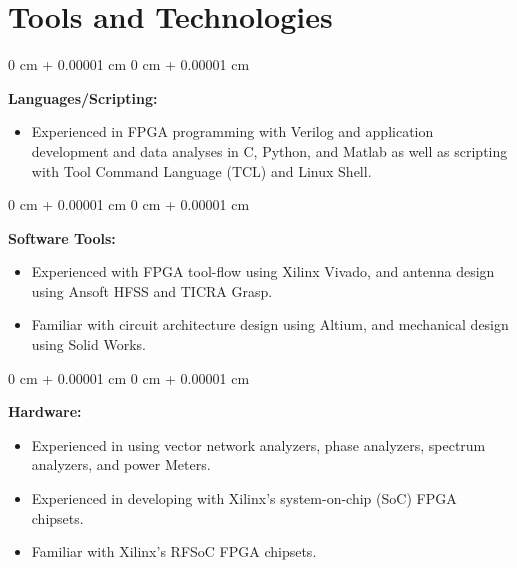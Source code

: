 \documentclass[10pt, letterpaper]{article}
\newenvironment{highlights}{
    \begin{itemize}[
        topsep=0.10 cm,
        parsep=0.10 cm,
        partopsep=0pt,
        itemsep=0pt,
        leftmargin=0 cm + 10pt     
    ]
}{
    \end{itemize}
} %
\newenvironment{onecolentry}{
    \begin{adjustwidth}{
        0 cm + 0.00001 cm
    }{
        0 cm + 0.00001 cm
    }
}{
    \end{adjustwidth}
} %
\begin{document}
    \section{Tools and Technologies}        
        \begin{onecolentry}
            \textbf{Languages/Scripting:} 
            \begin{highlights}
            \item Experienced in FPGA programming with Verilog and application development and data analyses in C, Python, and Matlab as well as scripting with Tool Command Language (TCL) and Linux Shell.              
            \end{highlights}

        \end{onecolentry}
        \vspace{0.2 cm}
        \begin{onecolentry}
            \textbf{Software Tools:}
            \begin{highlights}
                \item Experienced with FPGA tool-flow using Xilinx Vivado, and antenna design using Ansoft HFSS and TICRA Grasp. 
                \item Familiar with circuit architecture design using Altium, and mechanical design using Solid Works. 
            \end{highlights}
        \end{onecolentry}
        \vspace{0.2 cm}
        \begin{onecolentry}
            \textbf{Hardware:}  
            \begin{highlights}
                \item Experienced in using vector network analyzers, phase analyzers, spectrum analyzers, and power Meters. 
                \item Experienced in developing with Xilinx's system-on-chip (SoC) FPGA chipsets. 
                \item Familiar with Xilinx's RFSoC FPGA chipsets.                
            \end{highlights}

        \end{onecolentry} 

    
       


        
\end{document}

